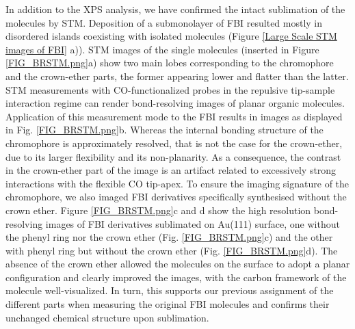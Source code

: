 \documentclass[aps,prl,reprint,longbibliography,superscriptaddress, english]{revtex4-1}
\begin{document}
In addition to the XPS analysis, we have confirmed the intact sublimation of the molecules by STM. Deposition of a submonolayer of FBI resulted mostly in disordered islands coexisting with isolated molecules (Figure \ref{Large Scale STM images of FBI} a)). STM images of the single molecules (inserted in Figure  \ref{FIG_BRSTM.png}a) show two main lobes corresponding to the chromophore and the crown-ether parts, the former appearing lower and flatter than the latter. STM measurements with CO-functionalized probes in the repulsive tip-sample interaction regime can render bond-resolving images of planar organic molecules.\cite{gross_recent_2011,gross_atomic_2018} Application of this measurement mode to the FBI results in images as displayed in Fig. \ref{FIG_BRSTM.png}b. Whereas the internal bonding structure of the chromophore is approximately resolved, that is not the case for the crown-ether, due to its larger flexibility and its non-planarity. As a consequence, the contrast in the crown-ether part of the image is an artifact related to excessively strong interactions with the flexible CO tip-apex.\cite{moll_mechanisms_2010,hapala_mechanism_2014} To ensure the imaging signature of the chromophore, we also imaged FBI derivatives specifically synthesised without the crown ether. Figure  \ref{FIG_BRSTM.png}c and d show the high resolution bond-resolving images of FBI derivatives sublimated on Au(111) surface, one without the phenyl ring nor the crown ether (Fig. \ref{FIG_BRSTM.png}c)  and the other with phenyl ring but without the crown ether (Fig. \ref{FIG_BRSTM.png}d). The absence of the crown ether allowed the molecules on the surface to adopt a planar configuration and clearly improved the images, with the carbon framework of the molecule well-visualized. In turn, this supports our previous assignment of the different parts when measuring the original FBI molecules and confirms their unchanged chemical structure upon sublimation.  
\end{document}
